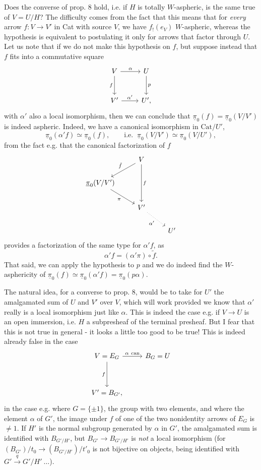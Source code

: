 \documentclass[11pt]{article}
\newcommand{\printedpage}[1]{\marginpar{\footnotesize p.~#1}}
\newcommand{\msp}[1]{\marginpar{\footnotesize [#1]}}
\newcommand{\upi}{\underline{\pi}}
\newcommand{\Cat}{\mathrm{Cat}}
\begin{document}
Does the converse of prop. 8 hold, i.e. if $H$ is totally $W$-aspheric, is the same true of $V = U/H$? The difficulty comes from the fact that this means that for \textit{every} arrow $f : V \longrightarrow V'$ in Cat with source $V$, we have $f_!(e_V)$ $W$-aspheric, whereas the hypothesis is equivalent to postulating it only for arrows that factor through $U$. Let us note that if we do not make this hypothesis on $f$, but suppose instead that $f$ fits into a commutative square \msp{page 95}
\[
\begin{tikzcd}[row sep=large]
V \arrow[r, "\alpha"] \arrow[d, "f"'] & U \arrow[d, "p"] \\
V' \arrow[r, "\alpha'"] & U',
\end{tikzcd}
\]
with $\alpha'$ also a local isomorphism, then we can conclude that $\upi_0(f) = \upi_0(V/V')$ is indeed aspheric. Indeed, we have a canonical isomorphism in $\Cat/U'$,
\[ \upi_0(\alpha'f) \simeq \upi_0(f), \qquad \text{i.e. } \ \upi_0(V/V') \simeq \upi_0(V/U'), \]
from the fact e.g. that the canonical factorization of $f$
\printedpage{67}
\[
\begin{tikzcd}[row sep=normal]
 & V \arrow[dl, "\tilde{f}"'] \arrow[dd, "f"] & \\
\upi_0(V/V') \arrow[dr, "\pi"'] & & \\
 & V' \arrow[dr, dotted, "\alpha'"'] & \\
 & & U'
\end{tikzcd}
\]
provides a factorization of the same type for $\alpha'f$, as
\[ \alpha'f = (\alpha'\pi) \circ \tilde{f}. \]
That said, we can apply the hypothesis to $p$ and we do indeed find the $W$-asphericity of $\upi_0(f) \simeq \upi_0(\alpha'f) = \upi_0(p\alpha)$.

\msp{page 96}
The natural idea, for a converse to prop. 8, would be to take for $U'$ the amalgamated sum of $U$ and $V'$ over $V$, which will work provided we know that $\alpha'$ really is a local isomorphism just like $\alpha$. This is indeed the case e.g. if $V \longrightarrow U$ is an open immersion, i.e. $H$ a subpresheaf of the terminal presheaf. But I fear that this is not true in general - it looks a little too good to be true! This is indeed already false in the case
\[
\begin{tikzcd}[row sep=huge]
V = E_G \arrow[r, "\alpha\ \text{can}"] \arrow[d, "f"'] & B_G = U \\
V' = B_{G'}, &
\end{tikzcd}
\]
in the case e.g. where $G = \{\pm 1\}$, the group with two elements, and where the element $\alpha$ of $G'$, the image under $f$ of one of the two nonidentity arrows of $E_G$ is $\neq 1$. If $H'$ is the normal subgroup generated by $\alpha$ in $G'$, the amalgamated sum is identified with $B_{G'/H'}$, but $B_{G'} \longrightarrow B_{G'/H'}$ is \textit{not} a local isomorphism (for $(B_{G'})/t_0 \longrightarrow (B_{G'/H'})/t'_0$ is not bijective on objects, being identified with $G' \overset{q}{\longrightarrow} G'/H' \ \ldots$).
\end{document}
